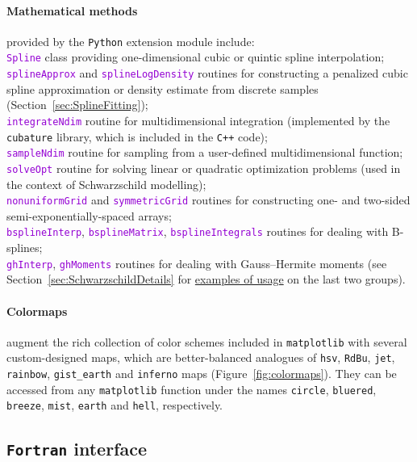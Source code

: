 \documentclass[12pt]{article}
\newcommand{\Cpp}  {\texttt{C++}\xspace}
\newcommand{\Python}{\texttt{Python}\xspace}
\newcommand{\Fortran}{\texttt{Fortran}\xspace}
\newcommand{\ttt}[1]{\textcolor{darkviolet}{\texttt{#1}}}
\newcommand{\ppp}[1]{\textcolor{darkolive} {\texttt{#1}}}
\begin{document}
\paragraph{Mathematical methods} provided by the \Python extension module include:\\
\ttt{Spline} class providing one-dimensional cubic or quintic spline interpolation;\\
\ttt{splineApprox} and \ttt{splineLogDensity} routines for constructing a penalized cubic spline approximation or density estimate from discrete samples (Section~\ref{sec:SplineFitting});\\
\ttt{integrateNdim} routine for multidimensional integration (implemented by the \texttt{cubature} library, which is included in the \Cpp code);\\
\ttt{sampleNdim} routine for sampling from a user-defined multidimensional function;\\
\ttt{solveOpt} routine for solving linear or quadratic optimization problems (used in the context of Schwarzschild modelling);\\
\ttt{nonuniformGrid} and \ttt{symmetricGrid} routines for constructing one- and two-sided semi-exponentially-spaced arrays;\\
\ttt{bsplineInterp}, \ttt{bsplineMatrix}, \ttt{bsplineIntegrals} routines for dealing with B-splines;\\
\ttt{ghInterp}, \ttt{ghMoments} routines for dealing with Gauss--Hermite moments (see Section~\ref{sec:SchwarzschildDetails} for \hyperref[sec:SchwarzschildExample]{examples of usage} on the last two groups).

\paragraph{Colormaps} augment the rich collection of color schemes included in \texttt{matplotlib} with several custom-designed maps, which are better-balanced analogues of \texttt{hsv}, \texttt{RdBu}, \texttt{jet}, \texttt{rainbow}, \texttt{gist_earth} and \texttt{inferno} maps (Figure~\ref{fig:colormaps}). They can be accessed from any \texttt{matplotlib} function under the names \ppp{circle}, \ppp{bluered}, \ppp{breeze}, \ppp{mist}, \ppp{earth} and \ppp{hell}, respectively.


\subsection{\Fortran interface}  \label{sec:Fortran}
\end{document}

